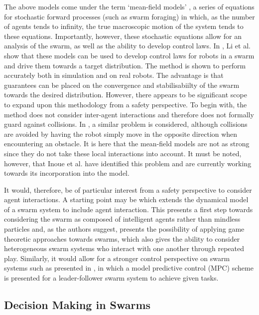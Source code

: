 \documentclass[.../main.tex]{subfiles}
\begin{document}
The above models come under the term ‘mean-field models’ \cite{Elamvazhuthi2019b}, a series of
equations for stochastic forward processes (such as swarm foraging) in which, as the number of
agents tends to infinity, the true macroscopic motion of the system tends to these equations.
Importantly, however, these stochastic equations allow for an analysis of the swarm, as well as the
ability to develop control laws. In \cite{Li2017}, Li et al. show that these models can be used to
develop control laws for robots in a swarm and drive them towards a target distribution. The method
is shown to perform accurately both in simulation and on real robots. The advantage is that
guarantees can be placed on the convergence and stabilisabiilty of the swarm towards the desired
distribution. However, there appears to be significant scope to expand upon this methodology from a
safety perspective. To begin with, the method does not consider inter-agent interactions and
therefore does not formally guard against collisions. In \cite{Inoue2019}, a similar problem is
considered, although collisions are avoided by having the robot simply move in the opposite
direction when encountering an obstacle. It is here that the mean-field models are not as strong
since they do not take these local interactions into account. It must be noted, however, that Inoue
et al. have identified this problem and are currently working towards its incorporation into the
model.

It would, therefore, be of particular interest from a safety perspective to consider agent
interactions. A starting point may be \cite{Bellomo2017} which extends the dynamical model of a
swarm system to include agent interaction. This presents a first step towards considering the swarm
as composed of intelligent agents rather than mindless particles and, as the authors suggest,
presents the possibility of applying game theoretic approaches towards swarms, which also gives the
ability to consider heterogeneous swarm systems who interact with one another through repeated play.
Similarly, it would allow for a stronger control perspective on swarm systems such as presented in
\cite{Borzi2015}, in which a model predictive control (MPC) scheme is presented for a
leader-follower swarm system to achieve given tasks. 


\subsection{Decision Making in Swarms} \label{sec::Decisions_in_Swarms}
\end{document}
